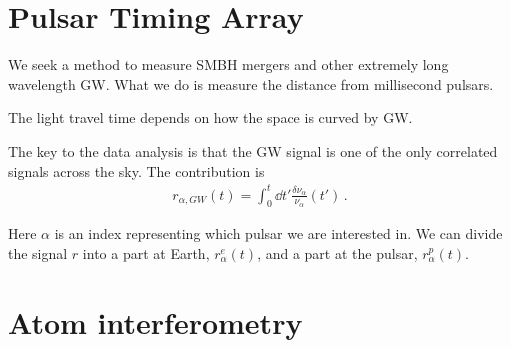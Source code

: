 \documentclass[main.tex]{subfiles}
\begin{document}


\section{Pulsar Timing Array}

We seek a method to measure SMBH mergers and other extremely long wavelength GW. 
What we do is measure the distance from millisecond pulsars. 

The light travel time depends on how the space is curved by GW. 

The key to the data analysis is that the GW signal is one of the only correlated signals across the sky. The contribution is 
%
\begin{align}
r_{\alpha , GW} (t) = \int_{0}^{t} \dd{t'} \frac{ \delta \nu _\alpha }{\nu _\alpha } (t')
\,.
\end{align}

Here \(\alpha \) is an index representing which pulsar we are interested in. 
We can divide the signal \(r\) into a part at Earth,  \(r^{e}_{\alpha }(t)\), and a part at the pulsar, \(r^{p}_{\alpha }(t)\). 


\section{Atom interferometry}
\end{document}
